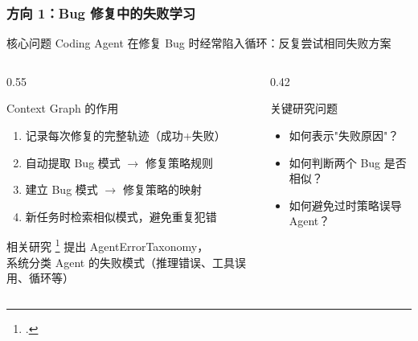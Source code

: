 \documentclass[aspectratio=169,10pt]{beamer}
\let\oldcite\cite
\renewcommand{\cite}[1]{\oldcite{#1}\footcitetext{#1}}
\begin{document}
\begin{frame}
  \frametitle{方向 1：Bug 修复中的失败学习}

  \begin{block}{核心问题}
    Coding Agent 在修复 Bug 时经常陷入循环：反复尝试相同失败方案
  \end{block}

  \begin{columns}[T]
    \begin{column}{0.55\textwidth}
      \begin{block}{Context Graph 的作用}
        \begin{enumerate}
          \item 记录每次修复的完整轨迹（成功+失败）
          \item 自动提取 Bug 模式 $\rightarrow$ 修复策略规则
          \item 建立 Bug 模式 $\rightarrow$ 修复策略的映射
          \item 新任务时检索相似模式，避免重复犯错
        \end{enumerate}
      \end{block}

      \begin{block}{相关研究}
        \cite{zhu2025fail} 提出 AgentErrorTaxonomy，\\
        系统分类 Agent 的失败模式（推理错误、工具误用、循环等）
      \end{block}
    \end{column}

    \begin{column}{0.42\textwidth}
      \begin{alertblock}{关键研究问题}
        \begin{itemize}
          \item 如何表示"失败原因"？
          \item 如何判断两个 Bug 是否相似？
          \item 如何避免过时策略误导 Agent？
        \end{itemize}
      \end{alertblock}
    \end{column}
  \end{columns}
\end{frame}
\end{document}
